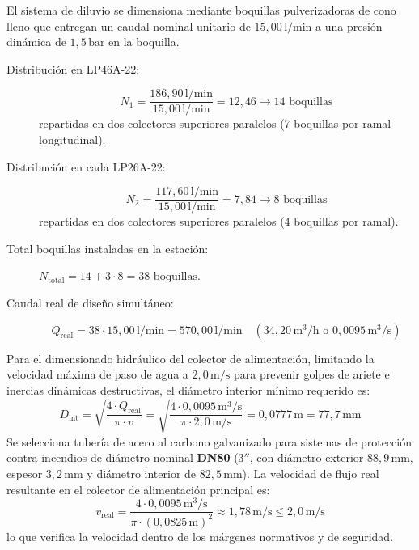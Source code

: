 \documentclass[12pt]{article}
\begin{document}
        El sistema de diluvio se dimensiona mediante boquillas pulverizadoras de cono lleno que entregan un caudal nominal unitario de $15,00\,\text{l}/\text{min}$ a una presión dinámica de $1,5\,\text{bar}$ en la boquilla.
        \begin{description}
            \item[Distribución en LP46A-22:]
            \begin{equation}
                N_1 = \frac{186,90\,\text{l}/\text{min}}{15,00\,\text{l}/\text{min}} = 12,46 \rightarrow 14\text{ boquillas}
            \end{equation}
            repartidas en dos colectores superiores paralelos (7 boquillas por ramal longitudinal).
            \item[Distribución en cada LP26A-22:]
            \begin{equation}
                N_2 = \frac{117,60\,\text{l}/\text{min}}{15,00\,\text{l}/\text{min}} = 7,84 \rightarrow 8\text{ boquillas}
            \end{equation}
            repartidas en dos colectores superiores paralelos (4 boquillas por ramal).
            \item[Total boquillas instaladas en la estación:] $N_{\text{total}} = 14 + 3 \cdot 8 = 38\text{ boquillas}$.
            \item[Caudal real de diseño simultáneo:]
            \begin{equation}
                Q_{\text{real}} = 38 \cdot 15,00\,\text{l}/\text{min} = 570,00\,\text{l}/\text{min} \quad (34,20\,\text{m}^3/\text{h} \text{ o } 0,0095\,\text{m}^3/\text{s})
            \end{equation}
        \end{description}

        Para el dimensionado hidráulico del colector de alimentación, limitando la velocidad máxima de paso de agua a $2,0\,\text{m}/\text{s}$ para prevenir golpes de ariete e inercias dinámicas destructivas, el diámetro interior mínimo requerido es:
        \begin{equation}
            D_{\text{int}} = \sqrt{\frac{4 \cdot Q_{\text{real}}}{\pi \cdot v}} = \sqrt{\frac{4 \cdot 0,0095\,\text{m}^3/\text{s}}{\pi \cdot 2,0\,\text{m}/\text{s}}} = 0,0777\,\text{m} = 77,7\,\text{mm}
        \end{equation}
        Se selecciona tubería de acero al carbono galvanizado para sistemas de protección contra incendios de diámetro nominal \textbf{DN80} ($3''$, con diámetro exterior $88,9\,\text{mm}$, espesor $3,2\,\text{mm}$ y diámetro interior de $82,5\,\text{mm}$).
        La velocidad de flujo real resultante en el colector de alimentación principal es:
        \begin{equation}
            v_{\text{real}} = \frac{4 \cdot 0,0095\,\text{m}^3/\text{s}}{\pi \cdot (0,0825\,\text{m})^2} \approx 1,78\,\text{m}/\text{s} \le 2,0\,\text{m}/\text{s}
        \end{equation}
        lo que verifica la velocidad dentro de los márgenes normativos y de seguridad.
\end{document}
